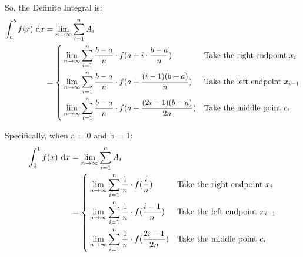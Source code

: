 \documentclass{article}
\begin{document}
	So, the Definite Integral is:
	\begin{align*}
		\int_{a}^{b} f(x) \d[x] & = \lim_{n \to \infty} \sum_{i=1}^{n} A_i
		\\
		& = \left\{\begin{aligned}
			& \lim_{n \to \infty} \sum_{i=1}^{n} \frac{b-a}{n} \cdot f(a + i \cdot \frac{b-a}{n}) && \text{Take the right endpoint } x_i
			\\
			& \lim_{n \to \infty} \sum_{i=1}^{n} \frac{b-a}{n} \cdot f(a + \frac{(i - 1)(b - a)}{n}) && \text{Take the left endpoint } x_{i-1}
			\\
			& \lim_{n \to \infty} \sum_{i=1}^{n} \frac{b-a}{n} \cdot f(a + \frac{(2i - 1)(b - a)}{2n}) && \text{Take the middle point } c_i
		\end{aligned}\right.
		\\
	\end{align*}
	
	Specifically, when a = 0 and b = 1:
	\begin{align*}
		\int_{0}^{1} f(x) \d[x] & = \lim_{n \to \infty} \sum_{i=1}^{n} A_i
		\\
		& = \left\{\begin{aligned}
			& \lim_{n \to \infty} \sum_{i=1}^{n} \frac{1}{n} \cdot f(\frac{i}{n}) && \text{Take the right endpoint } x_i
			\\
			& \lim_{n \to \infty} \sum_{i=1}^{n} \frac{1}{n} \cdot f(\frac{i - 1}{n}) && \text{Take the left endpoint } x_{i-1}
			\\
			& \lim_{n \to \infty} \sum_{i=1}^{n} \frac{1}{n} \cdot f(\frac{2i - 1}{2n}) && \text{Take the middle point } c_i
		\end{aligned}\right.
	\end{align*}
\end{document}
